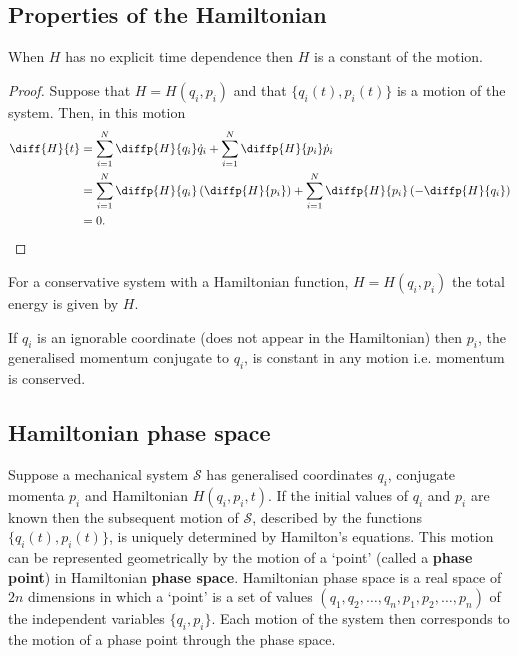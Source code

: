 \documentclass[12pt, a4paper]{article}
\begin{document}
\subsection{Properties of the Hamiltonian}

\begin{mdthm}
    When \(H\) has no explicit time dependence then \(H\) is a constant of the motion.
\end{mdthm}

\begin{proof}
    Suppose that \(H = H(q_i,p_i)\) and that \(\{q_i(t),p_i(t)\}\) is a motion of the system. Then, in this motion 
    \[\begin{aligned}
        \diff{H}{t} &= \sum_{i=1}^{N} \diffp{H}{{q_i}} \dot{q}_i + \sum_{i=1}^{N} \diffp{H}{{p_i}} \dot{p}_i \\
        &= \sum_{i=1}^{N} \diffp{H}{{q_i}} \left( \diffp{H}{{p_i}} \right) + \sum_{i=1}^{N} \diffp{H}{{p_i}} \left( -\diffp{H}{{q_i}} \right) \\
        &=0.
    \end{aligned}\]
\end{proof}

\begin{mdcor}
    For a conservative system with a Hamiltonian function, \(H = H(q_i,p_i)\) the total energy is given by \(H\).
\end{mdcor}

\begin{mdthm}
    If \(q_i\) is an ignorable coordinate (does not appear in the Hamiltonian) then \(p_i\), the generalised momentum conjugate to \(q_i\), is constant in any motion i.e. momentum is conserved.
\end{mdthm}

\subsection{Hamiltonian phase space}

Suppose a mechanical system \(\mathcal{S}\) has generalised coordinates \(q_i\), conjugate momenta \(p_i\) and Hamiltonian \(H(q_i,p_i,t)\). If the initial values of \(q_i\) and \(p_i\) are known then the subsequent motion of \(\mathcal{S}\), described by the functions \(\{q_i(t),p_i(t)\}\), is uniquely determined by Hamilton's equations. This motion can be represented geometrically by the motion of a `point' (called a \textbf{phase point}) in Hamiltonian \textbf{phase space}. Hamiltonian phase space is a real space of \(2n\) dimensions in which a `point' is a set of values \((q_1,q_2,\ldots, q_n, p_1,p_2,\ldots,p_n)\) of the independent variables \(\{q_i,p_i\}\). Each motion of the system then corresponds to the motion of a phase point through the phase space.
\end{document}
